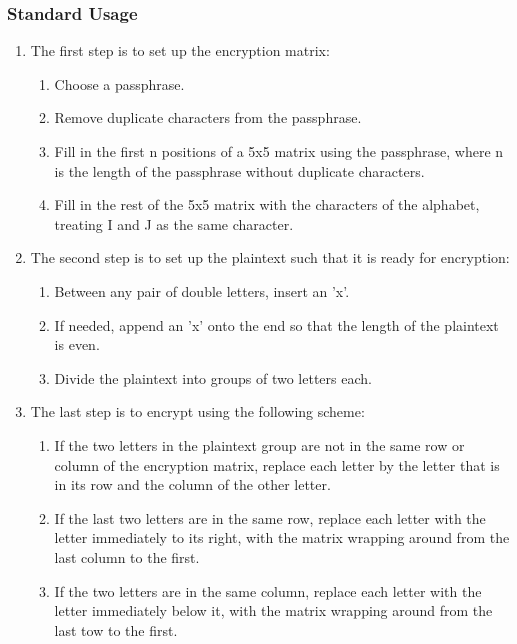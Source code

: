 \documentclass[14pt]{article}
\begin{document}
    	\subsubsection{Standard Usage}
    	\begin{enumerate}
    		\item The first step is to set up the encryption matrix:
                \begin{enumerate}
                    \item Choose a passphrase.
    
                    \item Remove duplicate characters from the passphrase.
    
                    \item Fill in the first n positions of a 5x5 matrix using the passphrase, where n is the length of the passphrase without duplicate characters.
    
                    \item Fill in the rest of the 5x5 matrix with the characters of the alphabet, treating I and J as the same character.
                \end{enumerate}
    
    		\item The second step is to set up the plaintext such that it is ready for encryption:
    			\begin{enumerate}
    				\item Between any pair of double letters, insert an 'x'.
    
    				\item If needed, append an 'x' onto the end so that the length of the plaintext is even.
    
    				\item Divide the plaintext into groups of two letters each.
    			\end{enumerate}
    
    		\item The last step is to encrypt using the following scheme:
    			\begin{enumerate}
    				\item If the two letters in the plaintext group are not in the same row or column of the encryption matrix, replace each letter by the letter that is in its row and the column of the other letter.
    
    				\item If the last two letters are in the same row, replace each letter with the letter immediately to its right, with the matrix wrapping around from the last column to the first.
    
    				\item If the two letters are in the same column, replace each letter with the letter immediately below it, with the matrix wrapping around from the last tow to the first.
    			\end{enumerate}
    	\end{enumerate}
        \cite{Trappe}
    
\end{document}
